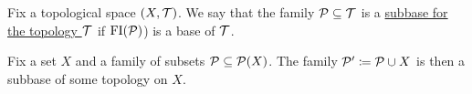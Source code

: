 \begin{definition}\label{def:topological_subbase}
  Fix a topological space $(X, \mathcal T)$. We say that the family $\mathcal P \subseteq \mathcal T$ is a \uline{subbase for the topology $\mathcal T$} if $\operatorname{FI}(\mathcal P)$) is a base of $\mathcal T$.
\end{definition}

\begin{proposition}
  Fix a set $X$ and a family of subsets $\mathcal P \subseteq \operatorname{\mathcal P}(X)$. The family $\mathcal P' \coloneqq \mathcal P \cup X$ is then a subbase of some topology on $X$.
\end{proposition}
